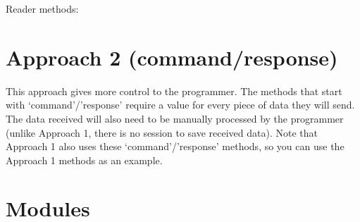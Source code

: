 \documentclass[letterpaper,10pt,english]{sphinxmanual}
\begin{document}
\begin{DUlineblock}{0em}
\item[] Reader methods:
\item[] {\hyperref[\detokenize{aliro_actuator.access_protocol.reader:aliro_actuator.access_protocol.reader.Reader.handle_select}]{}}
\item[] {\hyperref[\detokenize{aliro_actuator.access_protocol.reader:aliro_actuator.access_protocol.reader.Reader.handle_auth0}]{}}
\item[] {\hyperref[\detokenize{aliro_actuator.access_protocol.reader:aliro_actuator.access_protocol.reader.Reader.handle_auth1}]{}}
\item[] {\hyperref[\detokenize{aliro_actuator.access_protocol.reader:aliro_actuator.access_protocol.reader.Reader.handle_control_flow}]{}}
\item[] {\hyperref[\detokenize{aliro_actuator.access_protocol.reader:aliro_actuator.access_protocol.reader.Reader.handle_exchange}]{}}
\item[] {\hyperref[\detokenize{aliro_actuator.access_protocol.reader:aliro_actuator.access_protocol.reader.Reader.handle_load_cert}]{}}
\end{DUlineblock}


\chapter{Approach 2 (command/response)}
\label{\detokenize{index:approach-2-command-response}}
\sphinxAtStartPar
This approach gives more control to the programmer. The methods that start with
‘command’/’response’ require a value for every piece of data they will send. The data
received will also need to be manually processed by the programmer (unlike Approach 1,
there is no session to save received data).
Note that Approach 1 also uses these ‘command’/’response’ methods, so you can use the
Approach 1 methods as an example.


\chapter{Modules}
\label{\detokenize{index:modules}}
\sphinxstepscope
\end{document}
